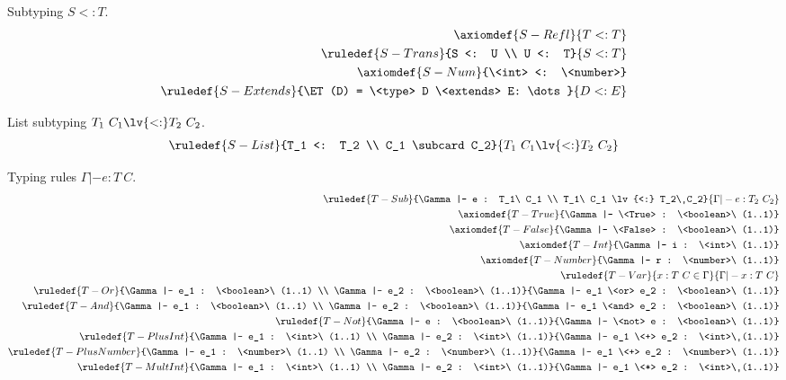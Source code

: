 Subtyping $S <: T$.
\begin{align*}
\axiomdef{S-Refl}{T <: T}
\\
\ruledef{S-Trans}{S <: U \\ U <: T}{S <: T}
\\
\axiomdef{S-Num}{\<int> <: \<number>}
\\
\ruledef{S-Extends}{\ET(D) = \<type> D \<extends> E: \dots}{D <: E}
\end{align*}

List subtyping $T_1\ C_1 \lv{<:} T_2\ C_2$.
\begin{align*}
\ruledef{S-List}{T_1 <: T_2 \\ C_1 \subcard C_2}{T_1\ C_1 \lv{<:} T_2\ C_2}
\end{align*}

Typing rules $\Gamma |- e : T\ C$.
\begin{align*}
\ruledef{T-Sub}{\Gamma |- e : T_1\ C_1 \\ T_1\ C_1 \lv{<:} T_2\ C_2}{\Gamma |- e : T_2\ C_2}
\\
\axiomdef{T-True}{\Gamma |- \<True> : \<boolean>\ (1..1)}
\\
\axiomdef{T-False}{\Gamma |- \<False> : \<boolean>\ (1..1)}
\\
\axiomdef{T-Int}{\Gamma |- i : \<int>\ (1..1)}
\\
\axiomdef{T-Number}{\Gamma |- r : \<number>\ (1..1)}
\\
\ruledef{T-Var}{x : T\ C \in \Gamma}{\Gamma |- x : T\ C}
\\
\ruledef{T-Or}{\Gamma |- e_1 : \<boolean>\ (1..1) \\ \Gamma |- e_2 : \<boolean>\ (1..1)}{\Gamma |- e_1 \<or> e_2 : \<boolean>\ (1..1)}
\\
\ruledef{T-And}{\Gamma |- e_1 : \<boolean>\ (1..1) \\ \Gamma |- e_2 : \<boolean>\ (1..1)}{\Gamma |- e_1 \<and> e_2 : \<boolean>\ (1..1)}
\\
\ruledef{T-Not}{\Gamma |- e : \<boolean>\ (1..1)}{\Gamma |- \<not> e : \<boolean>\ (1..1)}
\\
\ruledef{T-PlusInt}{\Gamma |- e_1 : \<int>\ (1..1) \\ \Gamma |- e_2 : \<int>\ (1..1)}{\Gamma |- e_1 \<+> e_2 : \<int>\ (1..1)}
\\
\ruledef{T-PlusNumber}{\Gamma |- e_1 : \<number>\ (1..1) \\ \Gamma |- e_2 : \<number>\ (1..1)}{\Gamma |- e_1 \<+> e_2 : \<number>\ (1..1)}
\\
\ruledef{T-MultInt}{\Gamma |- e_1 : \<int>\ (1..1) \\ \Gamma |- e_2 : \<int>\ (1..1)}{\Gamma |- e_1 \<*> e_2 : \<int>\ (1..1)}

\end{align*}
